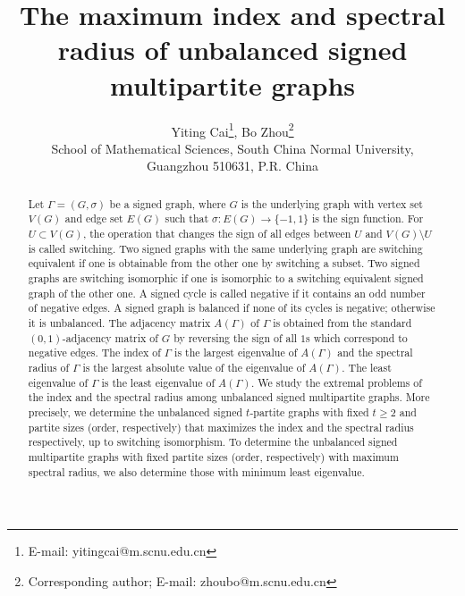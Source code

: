 \documentclass[12pt]{article}
\numberwithin{equation}{section}
\begin{document}
\title{The maximum index and spectral radius of unbalanced signed multipartite graphs}


\author{Yiting Cai\footnote{E-mail: yitingcai@m.scnu.edu.cn},  Bo Zhou\footnote{Corresponding author; E-mail: zhoubo@m.scnu.edu.cn}\\
School of  Mathematical Sciences, South China Normal University,\\
Guangzhou 510631, P.R. China
}

\date{}
\maketitle

\begin{abstract}
Let $\Gamma=(G,\sigma)$ be a signed graph, where $G$ is the underlying graph with vertex set $V(G)$ and edge set $E(G)$ such that $\sigma: E(G)\to \{-1,1\}$ is the sign function.  For $U\subset V(G)$,  the operation that changes the sign of all edges between $U$ and $V(G)\setminus U$ is 
called switching. Two signed graphs with the same underlying graph  are switching equivalent if one  is obtainable from  the other one by switching a subset. Two signed graphs are switching isomorphic
if one  is isomorphic to a switching equivalent signed graph of the other one. A signed cycle is called negative if it contains an odd number of negative edges. A signed graph is balanced if none of its cycles is negative; otherwise it is unbalanced. The adjacency matrix $A(\Gamma)$ of $\Gamma$ is obtained from the standard $(0,1)$-adjacency matrix of $G$ by reversing the sign of all $1$s which correspond to negative edges.
The index of $\Gamma$ is the largest eigenvalue of  $A(\Gamma)$ and the spectral radius of $\Gamma$ is  the largest absolute value of the eigenvalue of  $A(\Gamma)$. The least eigenvalue of $\Gamma$ is the least eigenvalue of $A(\Gamma)$.  We study the extremal problems of the index and the spectral radius among unbalanced signed multipartite graphs. More precisely,  we determine the unbalanced signed $t$-partite graphs with fixed $t\ge 2$ and partite sizes (order, respectively) that maximizes the index and the spectral radius respectively, up to switching isomorphism. To determine the unbalanced signed multipartite graphs with fixed partite sizes (order, respectively) with maximum spectral radius, we also determine those with minimum least eigenvalue.
\end{abstract}
\end{document}
